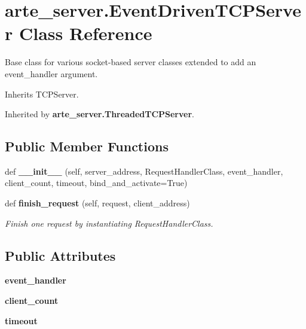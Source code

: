 \section{arte\+\_\+server.\+Event\+Driven\+T\+C\+P\+Server Class Reference}
\label{classarte__server_1_1_event_driven_t_c_p_server}


Base class for various socket-\/based server classes extended to add an event\+\_\+handler argument.  




Inherits T\+C\+P\+Server.



Inherited by {\bf arte\+\_\+server.\+Threaded\+T\+C\+P\+Server}.

\subsection*{Public Member Functions}
\begin{DoxyCompactItemize}
\item 
def {\bfseries \+\_\+\+\_\+init\+\_\+\+\_\+} (self, server\+\_\+address, Request\+Handler\+Class, event\+\_\+handler, client\+\_\+count, timeout, bind\+\_\+and\+\_\+activate=True)\label{classarte__server_1_1_event_driven_t_c_p_server_a11efb989565b9338d9f1204fa5e2e781}

\item 
def {\bf finish\+\_\+request} (self, request, client\+\_\+address)
\begin{DoxyCompactList}\small\item\em Finish one request by instantiating Request\+Handler\+Class. \end{DoxyCompactList}\end{DoxyCompactItemize}
\subsection*{Public Attributes}
\begin{DoxyCompactItemize}
\item 
{\bfseries event\+\_\+handler}\label{classarte__server_1_1_event_driven_t_c_p_server_ae16df161725349e69a81d04b5e44149e}

\item 
{\bfseries client\+\_\+count}\label{classarte__server_1_1_event_driven_t_c_p_server_af98a3575518e0eb2c2f2ddace357cbb1}

\item 
{\bfseries timeout}\label{classarte__server_1_1_event_driven_t_c_p_server_ad5526185d299676292d760a782b7c0fa}

\end{DoxyCompactItemize}


